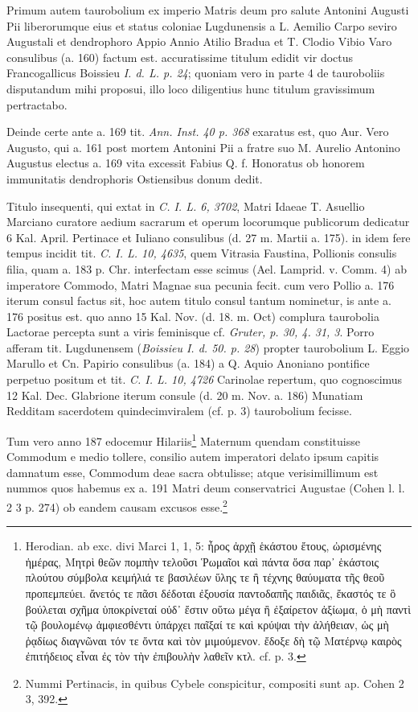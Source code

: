 \documentclass[a4paper, 11pt, oneside, polutonikogreek, german, twocolumn]{article}
\begin{document}
Primum autem taurobolium ex imperio Matris deum pro salute Antonini Augusti Pii liberorumque eius et status coloniae Lugdunensis a L. Aemilio Carpo seviro Augustali et dendrophoro Appio Annio Atilio Bradua et T. Clodio Vibio Varo consulibus (a. 160) factum est. accuratissime titulum edidit vir doctus Francogallicus Boissieu \emph{I. d. L. p. 24}; quoniam vero in parte 4 de tauroboliis disputandum mihi proposui, illo loco diligentius hunc titulum gravissimum pertractabo.

Deinde certe ante a. 169 tit. \emph{Ann. Inst. 40 p. 368} exaratus est, quo Aur. Vero Augusto, qui a. 161 post mortem Antonini Pii a fratre suo M. Aurelio Antonino Augustus electus a. 169 vita excessit Fabius Q. f. Honoratus ob honorem immunitatis dendrophoris Ostiensibus donum dedit.

Titulo insequenti, qui extat in \emph{C. I. L. 6, 3702}, Matri Idaeae T. Asuellio Marciano curatore aedium sacrarum et operum locorumque publicorum dedicatur 6 Kal. April. Pertinace et Iuliano consulibus (d. 27 m. Martii a. 175). in idem fere tempus incidit tit. \emph{C. I. L. 10, 4635}, quem Vitrasia Faustina, Pollionis consulis filia, quam a. 183 p. Chr. interfectam esse scimus (Ael. Lamprid. v. Comm. 4) ab imperatore Commodo, Matri Magnae sua pecunia fecit. cum vero Pollio a. 176 iterum consul factus sit, hoc autem titulo consul tantum nominetur, is ante a. 176 positus est. quo anno 15 Kal. Nov. (d. 18. m. Oct) complura taurobolia Lactorae percepta sunt a viris feminisque cf. \emph{Gruter, p. 30, 4. 31, 3}. Porro afferam tit. Lugdunensem (\emph{Boissieu I. d. 50. p. 28}) propter taurobolium L. Eggio Marullo et Cn. Papirio consulibus (a. 184) a Q. Aquio Anoniano pontifice perpetuo positum et tit. \emph{C. I. L. 10, 4726} Carinolae repertum, quo cognoscimus 12 Kal. Dec. Glabrione iterum consule (d. 20 m. Nov. a. 186) Munatiam Redditam sacerdotem quindecimviralem (cf. p. 3) taurobolium fecisse.

Tum vero anno 187 edocemur Hilariis\footnote{Herodian. ab exc. divi Marci 1, 1, 5: ἦρος ἀρχῇ ἑκάστου ἔτους, ὠρισμένης ἡμέρας, Μητρὶ θεῶν πομπὴν τελοῦσι Ῥωμαῖοι καὶ πάντα ὅσα παρ᾽ ἑκάστοις πλούτου σύμβολα κειμήλιά τε βασιλέων ὕλης τε ἢ τέχνης θαύυματα τῆς θεοῦ προπεμπεύει. ἄνετός τε πᾶσι δέδοται ἐξουσία παντοδαπῆς παιδιᾶς, ἔκαστός τε ὃ βούλεται σχῆμα ὑποκρίνεταί οὐδ᾽ ἔστιν οὕτω μέγα ἢ ἐξαίρετον ἀξίωμα, ὁ μὴ παντὶ τῷ βουλομένῳ ἀμφιεσθέντι ὑπάρχει παῖξαί τε καὶ κρύψαι τὴν ἀλήθειαν, ὡς μὴ ῥᾳδίως διαγνῶναι τόν τε ὄντα καὶ τὸν μιμούμενον. ἔδοξε δὴ τῷ Ματέρνῳ καιρὸς ἐπιτήδειος εἶναι ἐς τὸν τὴν ἐπιβουλὴν λαθεῖν κτλ. cf. p. 3.} Maternum quendam constituisse Commodum e medio tollere, consilio autem imperatori delato ipsum capitis damnatum esse, Commodum deae sacra obtulisse; atque verisimillimum est nummos quos habemus ex a. 191 Matri deum conservatrici Augustae (Cohen l. l. 2 3 p. 274) ob eandem causam excusos esse.\footnote{Nummi Pertinacis, in quibus Cybele conspicitur, compositi sunt ap. Cohen 2 3, 392.}
\end{document}
